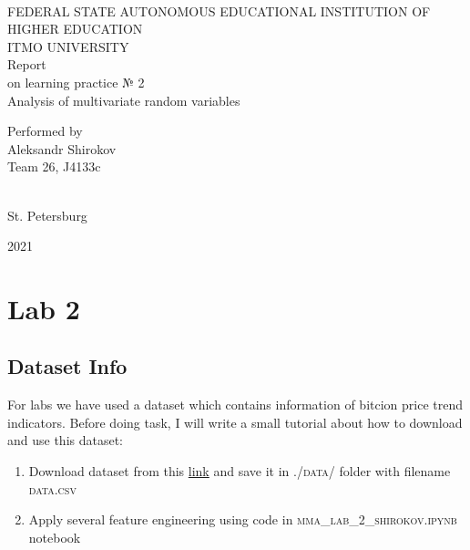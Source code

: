 \documentclass[%
12pt, %
final, %
oneside, %
onecolumn, %
centertags]{article} %
\theoremstyle{plain}
\theoremstyle{definition}
\theoremstyle{remark}
\begin{document}
	\begin{titlepage} 
		\begin{center}
		\textbf{}\\[2.0cm]
		\LARGE FEDERAL STATE AUTONOMOUS EDUCATIONAL INSTITUTION OF HIGHER EDUCATION \\[0.5cm]
		\Large ITMO UNIVERSITY \\[3cm]
		\LARGE Report\\
		\Large on learning practice № 2\\
		\Large Analysis of multivariate random variables \\[4cm]


		\begin{flushright}
		Performed by\\
		Aleksandr Shirokov\\
		Team 26, J4133c\\
		\ \\

		\end{flushright}

		\vfill 

		{\Large {St. Petersburg}} \par
		{\Large {2021}}
		\end{center} 
	\end{titlepage}

\tableofcontents
\newpage

\section{Lab 2}

\subsection{Dataset Info}

For labs we have used a dataset which contains information of bitcion price trend indicators. Before doing task, I will write a small tutorial about how to download and use this dataset:

\begin{enumerate}
	\item Download dataset from this \href{https://www.kaggle.com/devbcdestiller/bitcoin-usdt-price-trend-indicators}{link} and save it in \textsc{./data/} folder with filename \textsc{data.csv}
	\item Apply several feature engineering using code in \textsc{mma\_lab\_2\_shirokov.ipynb} notebook
\end{enumerate}
\end{document}
